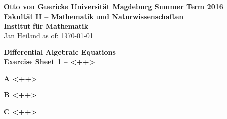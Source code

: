 \documentclass[a4paper,10pt]{article}
\begin{document}
{\bf Otto von Guericke Universit{\"a}t Magdeburg \hfill Summer Term 2016} \\
{\bf Fakult\"at II -- Mathematik und Naturwissenschaften} \\
{\bf Institut f\"ur Mathematik} \\
Jan Heiland \hfill as of: \today \\


\bigskip
\begin{center}
\textbf{\large Differential Algebraic Equations}\\
\smallskip
\textbf{Exercise Sheet 1 -- <++>}\\
\end{center}

\bigskip


{\bf A <++>}
\smallskip

{\bf B <++>}
\smallskip

{\bf C <++>}
\smallskip
\end{document}
